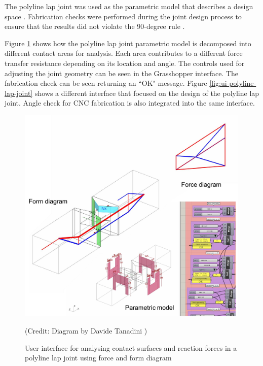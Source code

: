 The polyline lap joint was used as the parametric model that describes a design space . Fabrication checks were performed during the joint design process to ensure that the results did not violate the 90-degree rule . 

Figure \ref{fig:ui-contact-surface} shows how the polyline lap joint parametric model is decomposed into different contact areas for analysis. Each area contributes to a different force transfer resistance depending on its location and angle. The controls used for adjusting the joint geometry can be seen in the Grasshopper interface. The fabrication check can be seen returning an ``OK" message. Figure \ref{fig:ui-polyline-lap-joint} shows a different interface that focused on the design of the polyline lap joint. Angle check for CNC fabrication is also integrated into the same interface. 

\begin{figure}[!h]
    \centering
    \includegraphics[width=0.99\textwidth]{images/08/img04.png}
    \caption[User interface for analysing contact surfaces in a polyline lap joint]
    {User interface for analysing contact surfaces and reaction forces in a polyline lap joint using force and form diagram} {\footnotesize (Credit: Diagram by Davide Tanadini \parencite{tanadiniLimitAnalysisTimber2023})}
    \label{fig:ui-contact-surface}
\end{figure}

